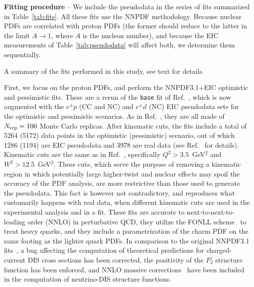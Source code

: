 \documentclass[11pt,a4paper]{article}
\newcommand{\myparagraph}[1]{\vspace{0.2cm} \noindent \textbf{#1} --}
\begin{document}
\myparagraph{Fitting procedure}
We include the pseudodata in the series of fits summarized in
Table~\ref{tab:fits}. All these fits use the NNPDF methodology. Because nuclear
PDFs are correlated with proton PDFs (the former should reduce to the latter in
the limit $A\to 1$, where $A$ is the nucleon number), and because the EIC
measurements of Table~\ref{tab:pseudodata} will affect both, we determine them
sequentially.
\begin{table}[!t]
  \footnotesize
  \centering
  
  \caption{A summary of the fits performed in this study, see text for details.}
  \label{tab:fits}
\end{table}

First, we focus on the proton PDFs, and perform the NNPDF3.1+EIC optimistic and
pessimistic fits. These are a rerun of the {\tt base} fit of
Ref.~\cite{Faura:2020oom}, which is now augmented with the $e^\pm p$ (CC and NC)
and $e^\pm d$ (NC) EIC pseudodata sets for the optimistic and pessimistic
scenarios. As in Ref.~\cite{Ball:2017nwa,Faura:2020oom}, they are all
made of $N_{\rm rep}=100$ Monte Carlo replicas. After kinematic cuts, the fits
include a total of 5264 (5172) data points in the optimistic (pessimistic)
scenario, out of which 1286 (1194) are EIC pseudodata and 3978 are real data
(see Ref.~\cite{Faura:2020oom} for details). Kinematic cuts are the same as
in Ref.~\cite{Ball:2017nwa,Faura:2020oom}, specifically
$Q^2>3.5$~GeV$^2$ and $W^2>12.5$~GeV$^2$. These cuts, which serve the purpose
of removing a kinematic region in which potentially large higher-twist and
nuclear effects may spoil the accuracy of the PDF analysis, are more
restrictive than those used to generate the pseudodata. This fact is however
not contradictory, and reproduces what customarily happens with real data, when
different kinematic cuts are used in the experimental analysis and in a fit.
These fits are accurate to next-to-next-to-leading order (NNLO) in perturbative
QCD, they utilize the FONLL scheme~\cite{Forte:2010ta,Ball:2015tna,Ball:2015dpa}
to treat heavy quarks, and they include a parametrization of the charm PDF on
the same footing as the lighter quark PDFs. In comparison to the original
NNPDF3.1 fits~\cite{Ball:2017nwa}, a bug affecting the computation of
theoretical predictions for charged-current DIS cross sections has been
corrected, the positivity of the $F_2^c$ structure function has been enforced,
and NNLO massive corrections~\cite{Berger:2016inr,Gao:2017kkx} have been
included in the computation of neutrino-DIS structure functions.
\end{document}
